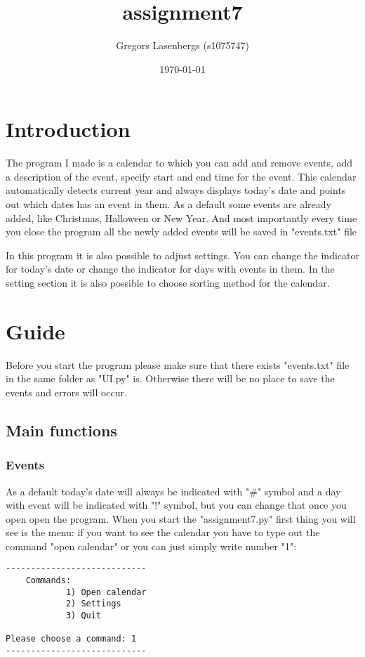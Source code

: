 \documentclass[a4paper, 12pt]{article}
\title{\textbf{assignment7}}
\author{Gregors Lasenbergs (s1075747)}
\date{\today}
\begin{document}
  \maketitle
  \tableofcontents

\section{Introduction}
  The program I made is a calendar to which you can add and remove events, add a description of the event, specify start and end time for the event. This calendar automatically detects current year and always displays today's date and points out which dates has an event in them. As a default some events are already added, like Christmas, Halloween or New Year. And most importantly every time you close the program all the newly added events will be saved in "events.txt" file
  
  In this program it is also possible to adjust settings. You can change the indicator for today's date or change the indicator for days with events in them. In the setting section it is also possible to choose sorting method for the calendar.

\section{Guide}
Before you start the program please make sure that there exists "events.txt" file in the same folder as "UI.py" is. Otherwise there will be no place to save the events and errors will occur.
    \subsection{Main functions}
    \subsubsection{Events}
    As a default today's date will always be indicated with "\#" symbol and a day with event will be indicated with "!" symbol, but you can change that once you open open the program. When you start the "assignment7.py" first thing you will see is the menu: if you want to see the calendar you have to type out the command "open calendar" or you can just simply write number "1":
    
    
 \begin{verbatim}   
----------------------------
    Commands:
            1) Open calendar
            2) Settings
            3) Quit
            
Please choose a command: 1
----------------------------
 \end{verbatim}   
 
\end{document}
